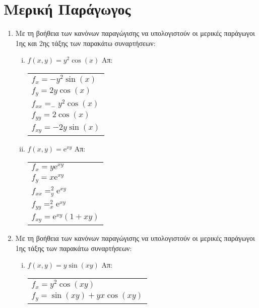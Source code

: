 \documentclass[a4paper,table]{report}
\begin{document}
\begin{center}
  \minibox{\large \bfseries \textcolor{Col1}{Ασκήσεις στις Μερικές Παραγώγους}}
\end{center}

\vspace{\baselineskip}


\section*{Μερική Παράγωγος}

\begin{enumerate}
  \item Με τη βοήθεια των κανόνων παραγώγισης να υπολογιστούν οι μερικές 
    παράγωγοι 1ης και 2ης  τάξης των παρακάτω συναρτήσεων:
    \begin{enumerate}[i)]
      \item $f(x,y)=y^2\cos (x)$ \hfill Απ: \begin{tabular}{l}
          $f_x=-y^2\sin(x)$ \\ 
          $f_y=2y\cos(x)$ \\
          $f_{xx}=_-y^2\cos(x)$ \\
          $f_{yy}=2\cos(x)$ \\
          $f_{xy}=-2y\sin(x)$ 
        \end{tabular}

      \item $f(x,y)= \mathrm{e}^{xy}$ \hfill Απ: \begin{tabular}{l}
          $f_x= y \mathrm{e}^{xy} $ \\ 
          $f_y= x \mathrm{e}^{xy} $ \\ 
          $f_{xx}=_y^2 \mathrm{e}^{xy} $ \\
          $f_{yy}=_x^2 \mathrm{e}^{xy} $ \\
          $f_{xy}= \mathrm{e}^{xy} (1+xy) $
        \end{tabular}
    \end{enumerate}


  \item Με τη βοήθεια των κανόνων παραγώγισης να υπολογιστούν οι μερικές 
    παράγωγοι 1ης τάξης των παρακάτω συναρτήσεων:

    \begin{enumerate}[i)]
      \item $f(x,y)=y\sin (xy)$ \hfill Απ: \begin{tabular}{l}
          $f_x=y^2\cos(xy)$ \\ 
          $f_y=\sin(xy)+yx\cos(xy)$
        \end{tabular}


\end{enumerate}
\end{enumerate}
\end{document}
